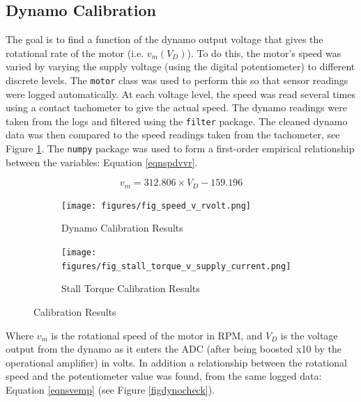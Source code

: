 \documentclass[twoside,a4]{report}
\begin{document}
	\subsection*{Dynamo Calibration}
	The goal is to find a function of the dynamo output voltage that gives the rotational rate of the motor (i.e. \(v_m ({V_D})\)). To do this, the motor's speed was varied by varying the supply voltage (using the digital potentiometer) to different discrete levels. The \texttt{motor} class was used to perform this so that sensor readings were logged automatically. At each voltage level, the speed was read several times using a contact tachometer to give the actual speed. The dynamo readings were taken from the logs and filtered using the \texttt{filter} package. The cleaned dynamo data was then compared to the speed readings taken from the tachometer, see Figure \ref{figspeedvrvolt}. The \texttt{numpy} package was used to form a first-order empirical relationship between the variables: Equation \ref{eqnspdvvr}.
	
	\begin{equation}
		v_m = 312.806 \times {V_D} - 159.196
		\label{eqnspdvvr}
	\end{equation}
	
	
	\begin{figure}[!htb]
		\centering
		\begin{subfigure}[t]{0.45\textwidth}
			\centering
			\texttt{[image: figures/fig\_speed\_v\_rvolt.png]}
			\caption{Dynamo Calibration Results}
			\label{figspeedvrvolt}
			\footnotesize
		\end{subfigure}
		\begin{subfigure}[t]{0.45\textwidth}
			\centering
			\texttt{[image: figures/fig\_stall\_torque\_v\_supply\_current.png]}
			\caption{Stall Torque Calibration Results}
			\label{figstalltcal}
			\footnotesize
		\end{subfigure}
		\label{figcals}
		\caption{Calibration Results}
	\end{figure}
	
	\noindent
	Where \(v_m\) is the rotational speed of the motor in RPM, and \(V_D\) is the voltage output from the dynamo as it enters the ADC (after being boosted x10 by the operational amplifier) in volts. In addition a relationship between the rotational speed and the potentiometer value was found, from the same logged data: Equation \ref{eqnsvemp} (see Figure \ref{figdynocheck}).
	
\end{document}
